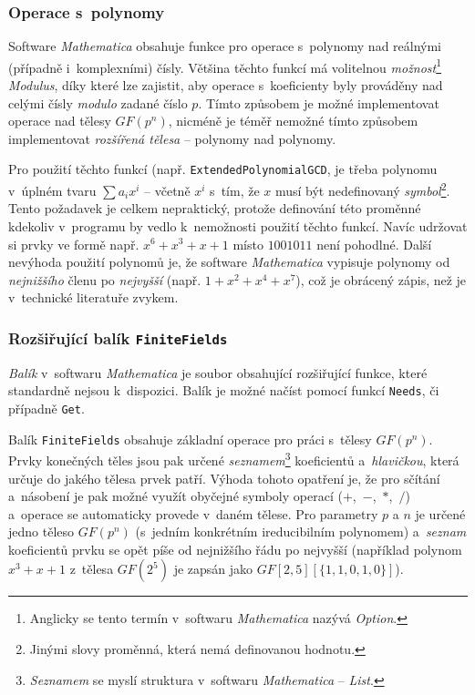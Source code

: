 \documentclass[thesis=M,czech,hidelinks]{FITthesis}[2012/06/26]
\newcommand{\0}{{\textcolor[gray]{0.75}{0}}}
\begin{document}
\subsubsection{Operace s~polynomy}

Software \emph{Mathematica} obsahuje funkce pro operace s~polynomy nad reálnými
(případně i~komplexními) čísly. Většina těchto funkcí má volitelnou
\emph{možnost}\footnote{
    Anglicky se tento termín v~softwaru \emph{Mathematica} nazývá \emph{Option}.
} \emph{Modulus}, díky které lze zajistit, aby operace s~koeficienty byly
prováděny nad celými čísly \emph{modulo} zadané číslo $p$. Tímto způsobem je
možné implementovat operace nad tělesy $GF(p^n)$, nicméně je téměř nemožné tímto
způsobem implementovat \emph{rozšířená tělesa} -- polynomy nad polynomy.

Pro použití těchto funkcí (např. \texttt{ExtendedPolynomialGCD}, je třeba
polynomu v~úplném tvaru $\sum a_i x^i$ -- včetně $x^i$ s~tím, že $x$ musí být
nedefinovaný \emph{symbol}\footnote{
    Jinými slovy proměnná, která nemá definovanou hodnotu.
}. Tento požadavek je celkem nepraktický, protože definování této proměnné
kdekoliv v~programu by vedlo k~nemožnosti použití těchto funkcí. Navíc udržovat
si prvky ve formě např. $x^6 + x^3 + x + 1$ místo $1001011$ není pohodlné.
Další nevýhoda použití polynomů je, že software \emph{Mathematica} vypisuje
polynomy od \emph{nejnižšího} členu po \emph{nejvyšší} (např. $1+x^2+x^4+x^7$),
což je obrácený zápis, než je v~technické literatuře zvykem.


\subsubsection{Rozšiřující balík \texttt{FiniteFields}}

\emph{Balík} v~softwaru \emph{Mathematica} je soubor obsahující rozšiřující
funkce, které standardně nejsou k~dispozici. Balík je možné načíst pomocí funkcí
\texttt{Needs}, či případně \texttt{Get}.

Balík \texttt{FiniteFields} obsahuje základní operace pro práci s~tělesy
$GF(p^n)$. Prvky konečných těles jsou pak určené \emph{seznamem}\footnote{
    \emph{Seznamem} se myslí struktura v~softwaru \emph{Mathematica}
    -- \emph{List}.
} koeficientů a~\emph{hlavičkou}, která určuje do jakého tělesa prvek patří.
Výhoda tohoto opatření je, že pro sčítání a~násobení je pak možné využít
obyčejné symboly operací ($+$,~$-$,~$*$,~$/$) a~operace se automaticky provede
v~daném tělese. Pro parametry $p$ a $n$ je určené jedno těleso $GF(p^n)$
(s~jedním konkrétním ireducibilním polynomem) a~\emph{seznam} koeficientů prvku
se opět píše od nejnižšího řádu po nejvyšší (například polynom $x^3 + x + 1$
z~tělesa $GF(2^5)$ je zapsán jako $GF[2,5][\{1,1,0,1,0\}] $).
\end{document}
